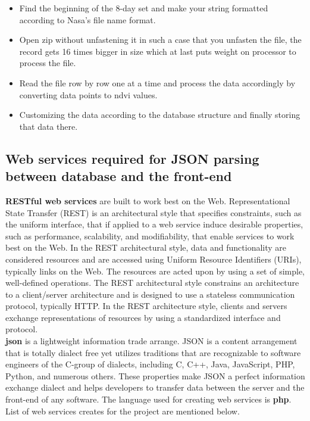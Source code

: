     \begin{itemize}
        \item Find the beginning of the 8-day set and make your string formatted according to Nasa's file name format.
        
        \item Open zip without unfastening it in such a case that you unfasten the file, the record gets 16 times bigger in size which at last puts weight on processor to process the file.
        
        \item Read the file row by row one at a time and process the data accordingly by converting data points to \gls{ndvi} values.
        
        \item Customizing the data according to the database structure and finally storing that data there.
    \end{itemize}

\subsection{Web services required for JSON parsing between database and the front-end}

\textbf{RESTful web services} are built to work best on the Web. Representational State Transfer (REST) is an architectural style that specifies constraints, such as the uniform interface, that if applied to a web service induce desirable properties, such as performance, scalability, and modifiability, that enable services to work best on the Web. In the REST architectural style, data and functionality are considered resources and are accessed using Uniform Resource Identifiers (URIs), typically links on the Web. The resources are acted upon by using a set of simple, well-defined operations. The REST architectural style constrains an architecture to a client/server architecture and is designed to use a stateless communication protocol, typically HTTP. In the REST architecture style, clients and servers exchange representations of resources by using a standardized interface and protocol. \cite{RESTful_web_services} \\

\textbf{\gls{json}} is a lightweight information trade arrange. JSON is a content arrangement that is totally dialect free yet utilizes traditions that are recognizable to software engineers of the C-group of dialects, including C, C++, Java, JavaScript, PHP, Python, and numerous others. These properties make JSON a perfect information exchange dialect and helps developers to transfer data between the server and the front-end of any software. The language used for creating web services is \textbf{\gls{php}}. List of web services creates for the project are mentioned below.

